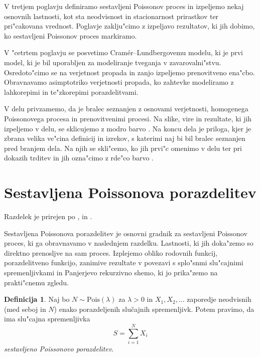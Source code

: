 \documentclass[12pt, a4paper, reqno]{amsart}
\theoremstyle{definition}
\newtheorem{definicija}{Definicija}[section]
\theoremstyle{plain}
\newcommand{\1}{\mathds{1}}
\newcommand{\Pois}[1]{\text{Pois}(#1)}
\begin{document}
    V tretjem poglavju definiramo sestavljeni Poissonov proces in izpeljemo nekaj osnovnih lastnosti, kot sta 
    neodvisnost in stacionarnost prirastkov ter pri"cakovana vrednost. Poglavje zaklju"cimo z izpeljavo rezultatov,
    ki jih dobimo, ko sestavljeni Poissonov proces markiramo.

    V "cetrtem poglavju se posvetimo Cramér--Lundbergovemu modelu, ki je prvi model, ki je bil uporabljen za
    modeliranje tveganja v zavarovalni"stvu. Osredoto"cimo se na verjetnost propada in zanjo izpeljemo prenovitveno
    ena"cbo. Obravnavamo asimptotriko verjetnosti propada, ko zahtevke modeliramo z lahkorepimi in te"zkorepimi
    porazdelitvami.

    V delu privzamemo, da je bralec seznanjen z osnovami verjetnosti, homogenega Poissonovega procesa in prenovitvenimi procesi.
    Na slike, vire in rezultate, ki jih izpeljemo v delu, se sklicujemo z modro barvo .
    Na koncu dela je priloga, kjer je zbrana velika ve"cina definicij in izrekov, s katerimi naj bi bil bralec seznanjen pred branjem dela. Na njih 
    se skli"cemo, ko jih prvi"c omenimo v delu ter pri dokazih trditev in jih ozna"cimo z rde"co barvo .

    \newpage
\section{Sestavljena Poissonova porazdelitev}

    \noindent
    Razdelek je prirejen po \cite{1}, \cite{2} in  \cite{4}.

    Sestavljena Poissonova porazdelitev je osnovni gradnik za sestavljeni Poissonov proces, ki ga obravnavamo 
    v naslednjem razdelku. Lastnosti, ki jih doka"zemo so direktno prenosljve na sam proces. Izplejemo 
    obliko rodovnih funkcij, porazdelitveno funkcijo, zanimive rezultate v povezavi s 
    splo"snmi slu"cajnimi spremenljivkami in Panjerjevo rekurzivno shemo, ki jo prika"zemo na 
    prakti"cnemu zgledu.

    \begin{definicija}
        Naj bo $N\sim \Pois{\lambda}$  za $\lambda >0$ in $X_1, X_2, \dots$ zaporedje neodvisnih (med seboj in $N$)
        enako porazdeljenih slučajnih spremenljivk. Potem pravimo, da ima slu"cajna spremenljivka
        \begin{equation*}
            S = \sum_{i=1}^NX_i
        \end{equation*}
        \textit{sestavljeno Poissonovo porazdelitev}. 
        \label{def:sestavljenaPoissonovaPorazdelitev}
    \end{definicija}
\end{document}
